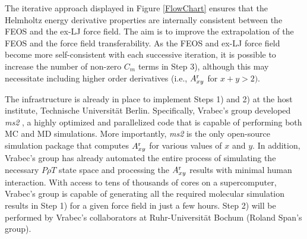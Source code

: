 \documentclass[12pt,a4paper]{article}
\begin{document}


The iterative approach displayed in Figure \ref{FlowChart} ensures that the Helmholtz energy derivative properties are internally consistent between the FEOS and the ex-LJ force field. The aim is to improve the extrapolation of the FEOS and the force field transferability. As the FEOS and ex-LJ force field become more self-consistent with each successive iteration, it is possible to increase the number of non-zero $C_m$ terms in Step 3), although this may necessitate including higher order derivatives (i.e., $A_{xy}^{\rm r}$ for $x+y>2)$.

The infrastructure is already in place to implement Steps 1) and 2) at the host institute, Technische Universit\"{a}t Berlin. Specifically, Vrabec's group developed \textit{ms2} \cite{ms2}, a highly optimized and parallelized code that is capable of performing both MC and MD simulations. More importantly, \textit{ms2} is the only open-source simulation package that computes $A_{xy}^{\rm r}$ for various values of $x$ and $y$. In addition, Vrabec's group has already automated the entire process of simulating the necessary $P \rho T$ state space and processing the $A_{xy}^{\rm r}$ results with minimal human interaction. With access to tens of thousands of cores on a supercomputer, Vrabec's group is capable of generating all the required molecular simulation results in Step 1) for a given force field in just a few hours. Step 2) will be performed by Vrabec's collaborators at Ruhr-Universit\"{a}t Bochum (Roland Span's group).
\end{document}
